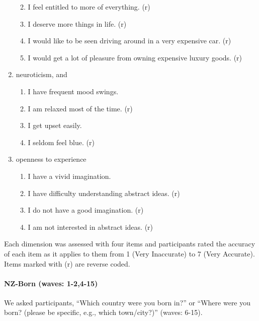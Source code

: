 \documentclass[
  single column]{article}
\let\oldparagraph\paragraph
\renewcommand{\paragraph}[1]{\oldparagraph{#1}\mbox{}}
\providecommand{\tightlist}{%
  \setlength{\itemsep}{0pt}\setlength{\parskip}{0pt}}\usepackage{longtable,booktabs,array}
\begin{document}
\begin{enumerate}
  \begin{enumerate}
  \def\labelenumii{\roman{enumii}.}
  \tightlist
  \item
    I feel entitled to more of everything. (r)
  \item
    I deserve more things in life. (r)
  \item
    I would like to be seen driving around in a very expensive car. (r)
  \item
    I would get a lot of pleasure from owning expensive luxury goods.
    (r)
  \end{enumerate}
\item
  neuroticism, and

  \begin{enumerate}
  \def\labelenumii{\roman{enumii}.}
  \tightlist
  \item
    I have frequent mood swings.
  \item
    I am relaxed most of the time. (r)
  \item
    I get upset easily.
  \item
    I seldom feel blue. (r)
  \end{enumerate}
\item
  openness to experience

  \begin{enumerate}
  \def\labelenumii{\roman{enumii}.}
  \tightlist
  \item
    I have a vivid imagination.
  \item
    I have difficulty understanding abstract ideas. (r)
  \item
    I do not have a good imagination. (r)
  \item
    I am not interested in abstract ideas. (r)
  \end{enumerate}
\end{enumerate}

Each dimension was assessed with four items and participants rated the
accuracy of each item as it applies to them from 1 (Very Inaccurate) to
7 (Very Accurate). Items marked with (r) are reverse coded.

\paragraph{NZ-Born (waves: 1-2,4-15)}\label{nz-born-waves-1-24-15}

We asked participants, ``Which country were you born in?'' or ``Where
were you born? (please be specific, e.g., which town/city?)'' (waves:
6-15).
\end{document}
